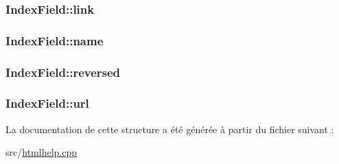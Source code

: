 \subsubsection[{link}]{ Index\+Field\+::link}\label{struct_index_field_ace714325ef33d35456d4ccbf5dcf227f}
\hypertarget{struct_index_field_af14ea53249ef3c89f95628f395dd4b99}{}
\subsubsection[{name}]{ Index\+Field\+::name}\label{struct_index_field_af14ea53249ef3c89f95628f395dd4b99}
\hypertarget{struct_index_field_a9cc482f75f35d70933dad31551f31b45}{}
\subsubsection[{reversed}]{ Index\+Field\+::reversed}\label{struct_index_field_a9cc482f75f35d70933dad31551f31b45}
\hypertarget{struct_index_field_acc522969a4da3f635cce4bf571fdc9a0}{}
\subsubsection[{url}]{ Index\+Field\+::url}\label{struct_index_field_acc522969a4da3f635cce4bf571fdc9a0}


La documentation de cette structure a été générée à partir du fichier suivant \+:\begin{DoxyCompactItemize}
\item 
src/\hyperlink{htmlhelp_8cpp}{htmlhelp.\+cpp}\end{DoxyCompactItemize}
